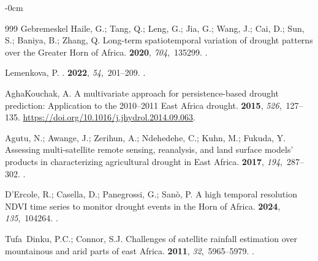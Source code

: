 \documentclass[jimaging,article,accept,pdftex,moreauthors]{Definitions/mdpi}
\begin{document}
\begin{adjustwidth}{-\extralength}{0cm}
\begin{thebibliography}{999}
{Gebremeskel Haile}, G.; Tang, Q.; Leng, G.; Jia, G.; Wang, J.; Cai, D.; Sun,
  S.; Baniya, B.; Zhang, Q.
\newblock Long-term spatiotemporal variation of drought patterns over the
  Greater Horn of Africa.
 {\bf 2020}, {\em 704},~135299.
.

Lemenkova, P.
.
 {\bf 2022}, {\em
  54},~201--209.
.

AghaKouchak, A.
\newblock A multivariate approach for persistence-based drought prediction:
  Application to the 2010–2011 East Africa drought.
 {\bf 2015}, {\em 526},~127--135. %
\newblock 
  {\url{https://doi.org/10.1016/j.jhydrol.2014.09.063}}.

Agutu, N.; Awange, J.; Zerihun, A.; Ndehedehe, C.; Kuhn, M.; Fukuda, Y.
\newblock Assessing multi-satellite remote sensing, reanalysis, and land
  surface models' products in characterizing agricultural drought in East
  Africa.
 {\bf 2017}, {\em 194},~287--302.
.

D’Ercole, R.; Casella, D.; Panegrossi, G.; Sanò, P.
\newblock A high temporal resolution NDVI time series to monitor drought events
  in the Horn of Africa.
 {\bf 2024}, {\em 135},~104264.
.

Tufa~Dinku, P.C.; Connor, S.J.
\newblock Challenges of satellite rainfall estimation over mountainous and arid
  parts of east Africa.
 {\bf 2011}, {\em
  32},~5965--5979.
.


\end{thebibliography}
\end{adjustwidth}
\end{document}
